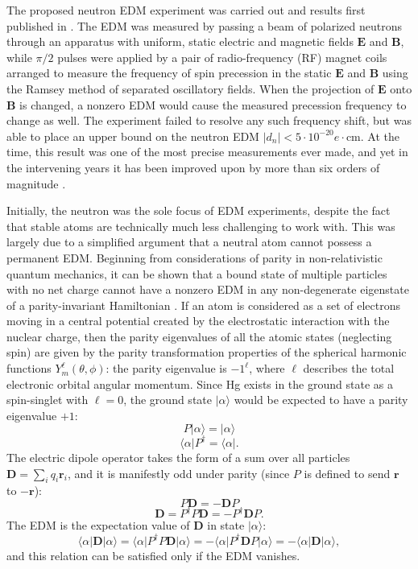 \documentclass [10pt, twoside] {uwthesis}[2012/04/02]
\begin{document}
The proposed neutron EDM experiment was carried out and results first published in \cite{1957_Smith_Purcell_Ramsey_nEDM}. The EDM was measured by passing a beam of polarized neutrons through an apparatus with uniform, static electric and magnetic fields $\mathbf{E}$ and $\mathbf{B}$, while $\pi/2$ pulses were applied by a pair of radio-frequency (RF) magnet coils arranged to measure the frequency of spin precession in the static $\mathbf{E}$ and $\mathbf{B}$ using the Ramsey method of separated oscillatory fields. When the projection of $\mathbf{E}$ onto $\mathbf{B}$ is changed, a nonzero EDM would cause the measured precession frequency to change as well. The experiment failed to resolve any such frequency shift, but was able to place an upper bound on the neutron EDM $|d_{n}| < 5\cdot 10^{-20} e\cdot \text{cm}.$ At the time, this result was one of the most precise measurements ever made, and yet in the intervening years it has been improved upon by more than six orders of magnitude \cite{2006_ILL_nEDM}.

Initially, the neutron was the sole focus of EDM experiments, despite the fact that stable atoms are technically much less challenging to work with. This was largely due to a simplified argument that a neutral atom cannot possess a permanent EDM. Beginning from considerations of parity in non-relativistic quantum mechanics, it can be shown that a bound state of multiple particles with no net charge cannot have a nonzero EDM in any non-degenerate eigenstate of a parity-invariant Hamiltonian \cite[p. 260]{Sakurai}. If an atom is considered as a set of electrons moving in a central potential created by the electrostatic interaction with the nuclear charge, then the parity eigenvalues of all the atomic states (neglecting spin) are given by the parity transformation properties of the spherical harmonic functions $Y^{\ell}_{m}(\theta,\phi)$: the parity eigenvalue is $-1^{\ell}$, where $\ell$ describes the total electronic orbital angular momentum. Since Hg exists in the ground state as a spin-singlet with $\ell = 0$, the ground state $\vert\alpha\rangle$ would be expected to have a parity eigenvalue $+1$: 
\[P\vert\alpha\rangle = \vert\alpha\rangle\] \[\langle\alpha\vert P^{\dagger}= \langle\alpha\vert.\] 
The electric dipole operator takes the form of a sum over all particles $\mathbf{D} = \sum_{i}q_i\mathbf{r}_i$, and it is manifestly odd under parity (since $P$ is defined to send $\mathbf{r}$ to $-\mathbf{r}$):
\begin{equation}\label{Dparity}P\mathbf{D} = -\mathbf{D}P \end{equation}
\begin{equation}\label{PD}\mathbf{D} = P^{\dagger}P\mathbf{D} = -P^{\dagger}\mathbf{D}P.\end{equation}
The EDM is the expectation value of $\mathbf{D}$ in state $\vert\alpha\rangle$: 
\begin{equation}\label{D=0}\langle\alpha\vert\mathbf{D}\vert\alpha\rangle = \langle\alpha\vert P^{\dagger}P\mathbf{D}\vert\alpha\rangle = -\langle\alpha\vert P^{\dagger}\mathbf{D}P\vert\alpha\rangle = -\langle\alpha\vert\mathbf{D}\vert\alpha\rangle,\end{equation}
and this relation can be satisfied only if the EDM vanishes.
\end{document}

